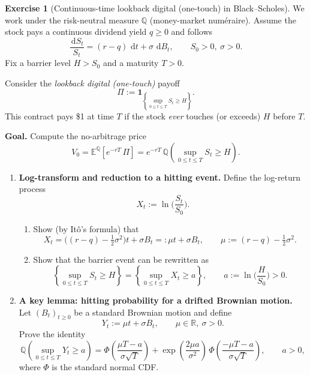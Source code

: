 \documentclass[11pt]{article}
\newcommand{\E}{\mathbb{E}}
\newcommand{\R}{\mathbb{R}}
\newcommand{\1}{\mathbf{1}}
\newcommand{\dd}{\,\mathrm{d}}
\theoremstyle{definition}
\newtheorem{exercise}{Exercise}[section]
\begin{document}
\begin{exercise}[Continuous-time lookback digital (one-touch) in Black--Scholes]
We work under the risk-neutral measure $\mathbb{Q}$ (money-market num\'eraire).
Assume the stock pays a continuous dividend yield $q\ge 0$ and follows
\[
\frac{\dd S_t}{S_t}=(r-q)\,\dd t+\sigma\,\dd B_t,
\qquad S_0>0,\ \sigma>0.
\]
Fix a barrier level $H>S_0$ and a maturity $T>0$.

Consider the \emph{lookback digital (one-touch)} payoff
\[
\Pi := \mathbf 1_{\left\{\sup_{0\le t\le T} S_t \ge H\right\}}.
\]
This contract pays \$1 at time $T$ if the stock \emph{ever} touches (or exceeds) $H$ before $T$.

\medskip
\noindent\textbf{Goal.} Compute the no-arbitrage price
\[
V_0 = \E^{\mathbb{Q}}\!\left[e^{-rT}\,\Pi\right]
= e^{-rT}\,\mathbb{Q}\!\left(\sup_{0\le t\le T} S_t \ge H\right).
\]

\begin{enumerate}[leftmargin=1.6em, itemsep=0.35em]

\item \textbf{Log-transform and reduction to a hitting event.}
Define the log-return process
\[
X_t := \ln\!\Big(\frac{S_t}{S_0}\Big).
\]
\begin{enumerate}[leftmargin=1.6em, itemsep=0.25em]
\item Show (by It\^o's formula) that
\[
X_t = \Big((r-q)-\tfrac12\sigma^2\Big)t + \sigma B_t
=: \mu t + \sigma B_t,
\qquad \mu:=(r-q)-\tfrac12\sigma^2.
\]
\item Show that the barrier event can be rewritten as
\[
\left\{\sup_{0\le t\le T} S_t \ge H\right\}
=
\left\{\sup_{0\le t\le T} X_t \ge a\right\},
\qquad
a:=\ln\!\Big(\frac{H}{S_0}\Big)>0.
\]
\end{enumerate}

\item \textbf{A key lemma: hitting probability for a drifted Brownian motion.}
Let $(B_t)_{t\ge0}$ be a standard Brownian motion and define
\[
Y_t := \mu t + \sigma B_t,
\qquad \mu\in\R,\ \sigma>0.
\]
Prove the identity
\begin{equation}\label{eq:hitting-drifted}
\mathbb{Q}\!\left(\sup_{0\le t\le T} Y_t \ge a\right)
=
\Phi\!\left(\frac{\mu T-a}{\sigma\sqrt{T}}\right)
+
\exp\!\left(\frac{2\mu a}{\sigma^2}\right)\,
\Phi\!\left(\frac{-\mu T-a}{\sigma\sqrt{T}}\right),
\qquad a>0,
\end{equation}
where $\Phi$ is the standard normal CDF.


\end{enumerate}
\end{exercise}
\end{document}
